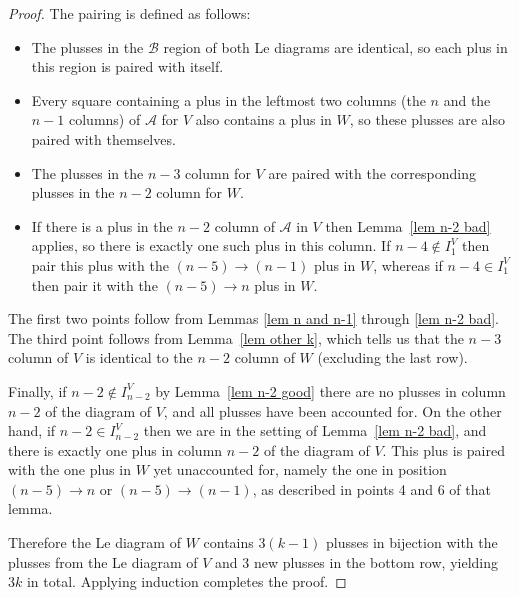 \documentclass[11pt]{article}
\theoremstyle{remark}
\theoremstyle{definition}
\begin{document}
\begin{proof}
 The pairing is defined as follows:
  \begin{itemize}
  \item The plusses in the $\mathcal{B}$ region of both Le diagrams are identical, so each plus in this region is paired with itself.
  \item Every square containing a plus in the leftmost two columns (the $n$ and the $n-1$ columns) of $\mathcal{A}$ for $V$ also contains a plus in $W$, so these plusses are also paired with themselves.
  \item The plusses in the $n-3$ column for $V$ are paired with the corresponding plusses in the $n-2$ column for $W$.
  \item If there is a plus in the $n-2$ column of $\mathcal{A}$ in $V$ then Lemma~\ref{lem n-2 bad} applies, so there is exactly one such plus in this column. If $n-4 \not\in I_1^V$ then pair this plus with the $(n-5)\rightarrow (n-1)$ plus in $W$, whereas if $n-4 \in I_1^V$ then pair it with the $(n-5) \rightarrow n$ plus in $W$.

  \end{itemize}
The first two points follow from Lemmas \ref{lem n and n-1} through \ref{lem n-2 bad}. The third point follows from Lemma~\ref{lem other k}, which tells us that the $n-3$ column of $V$ is identical to the $n-2$ column of $W$ (excluding the last row).

Finally, if $n-2 \not\in I_{n-2}^V$ by Lemma~\ref{lem n-2 good} there are no plusses in column $n-2$ of the diagram of $V$, and all plusses have been accounted for. On the other hand, if $n-2 \in I_{n-2}^V$ then we are in the setting of Lemma~\ref{lem n-2 bad}, and there is exactly one plus in column $n-2$ of the diagram of $V$. This plus is paired with the one plus in $W$ yet unaccounted for, namely the one in position $(n-5) \rightarrow n$ or $(n-5) \rightarrow (n-1)$, as described in points 4 and 6 of that lemma.

Therefore the Le diagram of $W$ contains $3(k-1)$ plusses in bijection with the plusses from the Le diagram of $V$ and 3 new plusses in the bottom row, yielding $3k$ in total. Applying induction completes the proof.
\end{proof}
\end{document}

